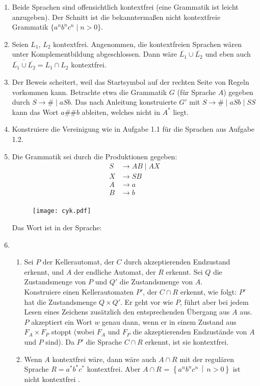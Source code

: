 \documentclass{article}
\newcommand{\menge}[2]{\ensuremath{\left\lbrace #1 \,\middle\vert\, #2 \right\rbrace}}
\newcommand{\harrypotter}{\Lightning}
\begin{document}
{\begin{enumerate}
\item Beide Sprachen sind offensichtlich kontextfrei (eine Grammatik ist leicht anzugeben). Der Schnitt ist die bekanntermaßen nicht kontextfreie Grammatik $\{a^nb^nc^n\mid  n > 0\}$.
\item Seien $L_1$, $L_2$ kontextfrei. Angenommen, die kontextfreien Sprachen wären unter Komplementbildung abgeschlossen. Dann wäre $\overline{L_1} \cup \overline{L_2}$ und eben auch $\overline{\overline{L_1} \cup \overline{L_2}} = L_1 \cap L_2$ kontextfrei.
\item Der Beweis scheitert, weil das Startsymbol auf der rechten Seite von Regeln vorkommen kann. Betrachte etwa die Grammatik $G$ (für Sprache $A$) gegeben durch $S \rightarrow \# \mid  aSb$. Das nach Anleitung konstruierte $G'$ mit $S \rightarrow \# \mid  aSb \mid  SS$ kann das Wort $a\#\#b$ ableiten, welches nicht in $A^*$ liegt.
\item Konstruiere die Vereinigung wie in Aufgabe 1.1 für die Sprachen aus Aufgabe 1.2.
\item Die Grammatik sei durch die Produktionen gegeben:
\begin{align*}
S&\rightarrow AB\mid AX\\
X&\rightarrow SB\\
A&\rightarrow a \\
B&\rightarrow b \\
\end{align*}
\begin{figure}
	\texttt{[image: cyk.pdf]}
\end{figure}
Das Wort ist in der Sprache:
\item \begin{enumerate}
	\item Sei $P$ der Kellerautomat, der $C$ durch akzeptierenden Endzustand erkennt, und $A$ der endliche Automat, der $R$ erkennt. Sei $Q$ die Zustandsmenge von $P$ und $Q'$ die Zustandsmenge von $A$. \\ Konstruiere einen Kellerautomaten $P'$, der $C \cap R$ erkennt, wie folgt: $P'$ hat die Zustandsmenge $Q \times Q'$. Er geht vor wie $P$, führt aber bei jedem Lesen eines Zeichens zusätzlich den entsprechenden Übergang aus $A$ aus. $P$ akzeptiert ein Wort $w$ genau dann, wenn er in einem Zustand aus $F_A \times F_P$ stoppt (wobei $F_A$ und $F_P$ die akzeptierenden Endzustände von $A$ und $P$ sind). Da $P'$ die Sprache $C \cap R$ erkennt, ist sie kontextfrei.
	\item Wenn $A$ kontextfrei wäre, dann wäre auch $A \cap R$ mit der regulären Sprache $R = a^*b^*c^*$ kontextfrei. Aber $A \cap R$ = $\menge{a^nb^nc^n}{n > 0}$ ist nicht kontextfrei \harrypotter.
\end{enumerate}
\end{enumerate}
}
\end{document}

